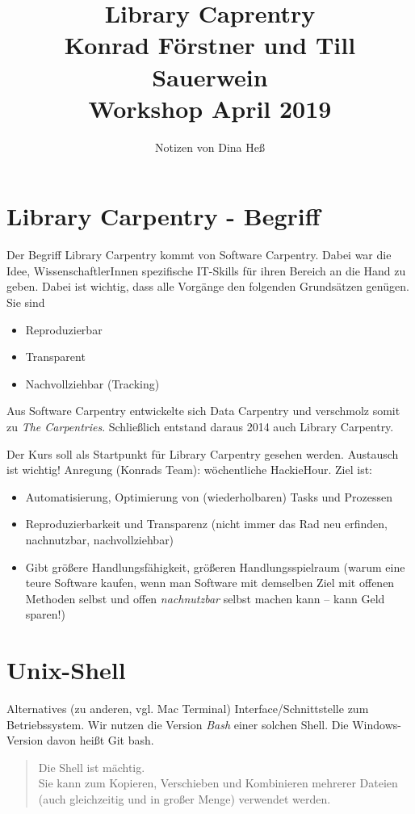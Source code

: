 \documentclass[11pt, a4paper, german]{article}
\title{Library Caprentry\\Konrad F\"orstner und Till Sauerwein\\Workshop April 2019}
\author{Notizen von Dina He\ss}
\begin{document}
	
	\maketitle
	\tableofcontents
	\cleardoublepage
	\thispagestyle{empty}
	\newpage
\section{Library Carpentry - Begriff}
Der Begriff Library Carpentry kommt von Software Carpentry. Dabei war die Idee, WissenschaftlerInnen spezifische IT-Skills für ihren Bereich an die Hand zu geben. Dabei ist wichtig, dass alle Vorgänge den folgenden Grundsätzen genügen. Sie sind
\begin{itemize}
	\item Reproduzierbar
	\item Transparent
	\item Nachvollziehbar (Tracking)
\end{itemize}
Aus Software Carpentry entwickelte sich Data Carpentry und verschmolz somit zu \emph{The Carpentries}. Schließlich entstand daraus 2014 auch Library Carpentry. 

Der Kurs soll als Startpunkt für Library Carpentry gesehen werden. Austausch ist wichtig! Anregung (Konrads Team): wöchentliche HackieHour. Ziel ist: 
\begin{itemize}
	\item Automatisierung, Optimierung von (wiederholbaren) Tasks und Prozessen
	\item Reproduzierbarkeit und Transparenz (nicht immer das Rad neu erfinden, nachnutzbar, nachvollziehbar)
	\item Gibt größere Handlungsfähigkeit, größeren Handlungsspielraum (warum eine teure Software kaufen, wenn man Software mit demselben Ziel mit offenen Methoden selbst und offen \emph{nachnutzbar} selbst machen kann -- kann Geld sparen!)
	\end{itemize}
\section{Unix-Shell}
Alternatives (zu anderen, vgl. Mac Terminal) Interface/Schnittstelle zum Betriebssystem. Wir nutzen die Version \emph{Bash} einer solchen Shell. Die Windows-Version davon heißt Git bash. 
\begin{quote}
	Die Shell ist mächtig.\\
	Sie kann zum Kopieren, Verschieben und Kombinieren mehrerer Dateien (auch gleichzeitig und in großer Menge) verwendet werden. 
\end{quote}
\end{document}
